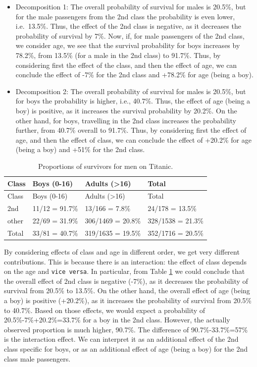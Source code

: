 \documentclass[]{krantz}
\begin{document}
\begin{itemize}
\item
  Decomposition 1: The overall probability of survival for males is 20.5\%, but for the male passengers from the 2nd class the probability is even lower, i.e.~13.5\%. Thus, the effect of the 2nd class is negative, as it decreases the probability of survival by 7\%. Now, if, for male passengers of the 2nd class, we consider age, we see that the survival probability for boys increases by 78.2\%, from 13.5\% (for a male in the 2nd class) to 91.7\%. Thus, by considering first the effect of the class, and then the effect of age, we can conclude the effect of -7\% for the 2nd class and +78.2\% for age (being a boy).
\item
  Decomposition 2: The overall probability of survival for males is 20.5\%, but for boys the probability is higher, i.e., 40.7\%. Thus, the effect of age (being a boy) is positive, as it increases the survival probability by 20.2\%. On the other hand, for boys, travelling in the 2nd class increases the probability further, from 40.7\% overall to 91.7\%. Thus, by considering first the effect of age, and then the effect of class, we can conclude the effect of +20.2\% for age (being a boy) and +51\% for the 2nd class.
\end{itemize}

\begin{longtable}[]{@{}llll@{}}
\caption{\label{tab:titanicMaleSurvival} Proportions of survivors for men on Titanic.}\tabularnewline
\toprule
Class & Boys (0-16) & Adults (\textgreater{}16) & Total\tabularnewline
\midrule
\endfirsthead
\toprule
Class & Boys (0-16) & Adults (\textgreater{}16) & Total\tabularnewline
\midrule
\endhead
2nd & 11/12 = 91.7\% & 13/166 = 7.8\% & 24/178 = 13.5\%\tabularnewline
other & 22/69 = 31.9\% & 306/1469 = 20.8\% & 328/1538 = 21.3\%\tabularnewline
Total & 33/81 = 40.7\% & 319/1635 = 19.5\% & 352/1716 = 20.5\%\tabularnewline
\bottomrule
\end{longtable}

By considering effects of class and age in different order, we get very different contributions. This is because there is an interaction: the effect of class depends on the age and \texttt{vice\ versa}. In particular, from Table \ref{tab:titanicMaleSurvival} we could conclude that the overall effect of 2nd class is negative (-7\%), as it decreases the probability of survival from 20.5\% to 13.5\%. On the other hand, the overall effect of age (being a boy) is positive (+20.2\%), as it increases the probability of survival from 20.5\% to 40.7\%. Based on those effects, we would expect a probability of 20.5\%-7\%+20.2\%=33.7\% for a boy in the 2nd class. However, the actually observed proportion is much higher, 90.7\%. The difference of 90.7\%-33.7\%=57\% is the interaction effect. We can interpret it as an additional effect of the 2nd class specific for boys, or as an additional effect of age (being a boy) for the 2nd class male passengers.
\end{document}

